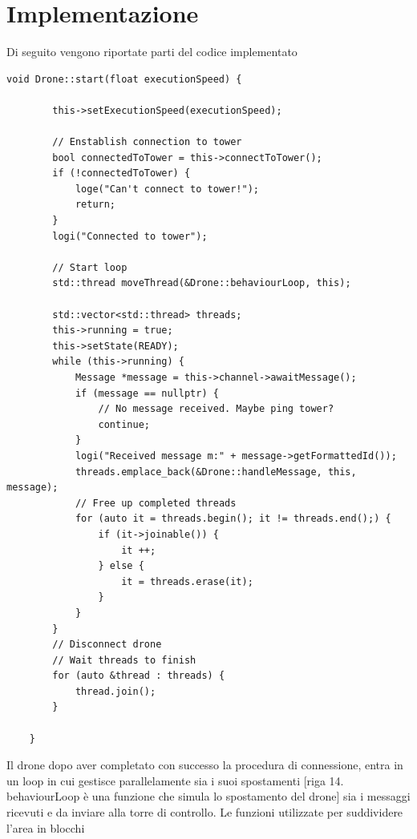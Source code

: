 \documentclass[a4paper, 11pt]{article}
\begin{document}
\section{Implementazione}
Di seguito vengono riportate parti del codice implementato 
\begin{lstlisting}[style=customcpp, caption={da drone.cpp}]
    void Drone::start(float executionSpeed) {

        this->setExecutionSpeed(executionSpeed);

        // Enstablish connection to tower
        bool connectedToTower = this->connectToTower();
        if (!connectedToTower) {
            loge("Can't connect to tower!");
            return;
        }
        logi("Connected to tower");

        // Start loop
        std::thread moveThread(&Drone::behaviourLoop, this);

        std::vector<std::thread> threads;
        this->running = true;
        this->setState(READY);
        while (this->running) {
            Message *message = this->channel->awaitMessage();
            if (message == nullptr) {
                // No message received. Maybe ping tower?
                continue;
            }
            logi("Received message m:" + message->getFormattedId());
            threads.emplace_back(&Drone::handleMessage, this, message);
            // Free up completed threads
            for (auto it = threads.begin(); it != threads.end();) {
                if (it->joinable()) {
                    it ++;
                } else {
                    it = threads.erase(it);
                }
            }
        }
        // Disconnect drone
        // Wait threads to finish
        for (auto &thread : threads) {
            thread.join();
        }

    }
    \end{lstlisting}
    Il drone dopo aver completato con successo la procedura di connessione, entra in un loop in cui gestisce parallelamente sia i suoi spostamenti [riga 14.  behaviourLoop è una funzione che simula lo spostamento del drone] sia i messaggi ricevuti e da inviare alla torre di controllo.
    \newpage
    Le funzioni utilizzate per suddividere l'area in blocchi
\end{document}

